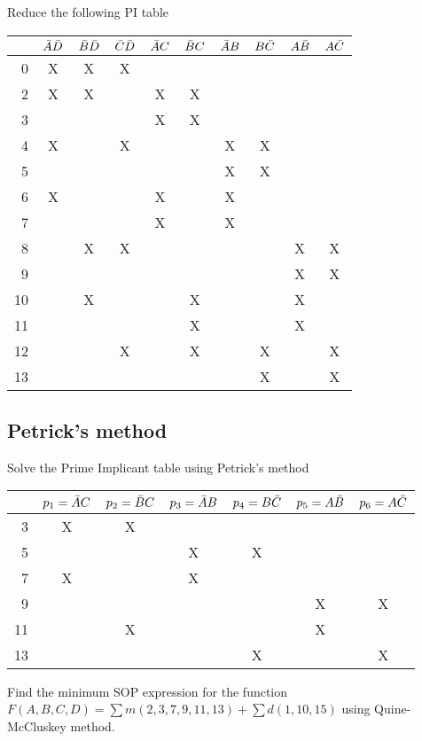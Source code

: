 \begin{example}
  Reduce the following PI table\\
  \begin{tabular}{r|ccccccccc}
    \toprule
    & $\bar{A}\bar{D}$ & $\bar{B}\bar{D}$ & $\bar{C}\bar{D}$ & $\bar{A} C$ & $\bar{B} C$ & $\bar{A} B$ & $B \bar{C}$& $A\bar{B}$ & $A \bar{C}$ \\
    \midrule
     0 & X & X & X &   &   &   &   &   &   \\
     2 & X & X &   & X & X &   &   &   &   \\
     3 &   &   &   & X & X &   &   &   &   \\
     4 & X &   & X &   &   & X & X &   &   \\
     5 &   &   &   &   &   & X & X &   &   \\
     6 & X &   &   & X &   & X &   &   &   \\
     7 &   &   &   & X &   & X &   &   &   \\
     8 &   & X & X &   &   &   &   & X & X \\
     9 &   &   &   &   &   &   &   & X & X \\
    10 &   & X &   &   & X &   &   & X &   \\
    11 &   &   &   &   & X &   &   & X &   \\
    12 &   &   & X &   & X &   & X &   & X \\
    13 &   &   &   &   &   &   & X &   & X \\
    \bottomrule
  \end{tabular}
\end{example}
\vspace{20em}

\subsection{Petrick's method}

\begin{example}
  Solve the Prime Implicant table using Petrick's method\\
  \begin{tabular}{r|cccccc}
    \toprule
    & $p_1 = \bar{A} C$ & $p_2 = \bar{B} C$ & $p_3 = \bar{A} B$ & $p_4 = B \bar{C}$& $p_5 = A\bar{B}$ & $p_6 = A \bar{C}$ \\
    \midrule
     3 & X & X &   &   &   &   \\
     5 &   &   & X & X &   &   \\
     7 & X &   & X &   &   &   \\
     9 &   &   &   &   & X & X \\
    11 &   & X &   &   & X &   \\
    13 &   &   &   & X &   & X \\
    \bottomrule
  \end{tabular}
\end{example}
\vspace{20em}


\begin{example}
  Find the minimum SOP expression for the function $F (A, B, C, D) = \sum m(2, 3, 7,
  9, 11, 13) + \sum d(1, 10, 15)$ using Quine-McCluskey method.
\end{example}
